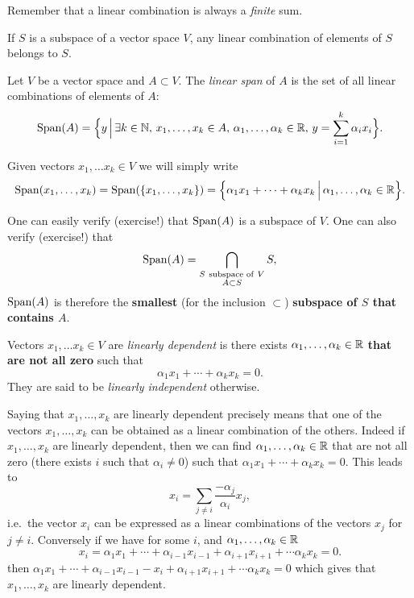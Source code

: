 \documentclass[11pt,nocut]{article}
\begin{document}
Remember that a linear combination is always a \emph{finite} sum.

\begin{remark}
	If $S$ is a subspace of a vector space $V$, any linear combination of elements of $S$ belongs to $S$.
\end{remark}

\begin{definition}[Span]
	Let $V$ be a vector space and $A \subset V$. The \emph{linear span} of $A$ is the set of all linear combinations of elements of $A$:
	$$
	{{\rm Span}}(A) = 
	\Big\{ y \, \Big| \, \exists k \in \mathbb{N}, \, x_1, \dots, x_k \in A, \, \alpha_1, \dots, \alpha_k \in \mathbb{R}, \, y = \sum_{i=1}^k \alpha_i x_i \Big\}.
	$$
\end{definition}
	Given vectors $x_1, \dots x_k \in V$ we will simply write
	$$
	{{\rm Span}}(x_1, \dots, x_k) = {{\rm Span}}(\{x_1, \dots, x_k \}) =
	\Big\{ \alpha_1 x_1 + \cdots + \alpha_k x_k \, \Big| \, \alpha_1, \dots, \alpha_k \in \mathbb{R} \Big\}.
	$$

	One can easily verify (exercise!) that ${{\rm Span}}(A)$ is a subspace of $V$. One can also verify (exercise!) that
$$
{{\rm Span}}(A) = \bigcap_{\substack{S \ \text{subspace of} \ V \\ A \subset S}} S,
$$
${{\rm Span}}(A)$ is therefore the \textbf{smallest} (for the inclusion $\subset$) \textbf{subspace of $S$ that contains $A$}.

\begin{definition}
	Vectors $x_1, \dots x_k \in V$ are \emph{linearly dependent} is there exists $\alpha_1, \dots, \alpha_k \in \mathbb{R}$ \textbf{that are not all zero} such that 
	$$
	\alpha_1 x_1 + \cdots + \alpha_k x_k = 0.
	$$
	They are said to be \emph{linearly independent} otherwise.
\end{definition}

Saying that $x_1, \dots, x_k$ are linearly dependent precisely means that one of the vectors $x_1, \dots, x_k$ can be obtained as a linear combination of the others. 
Indeed if $x_1, \dots, x_k$ are linearly dependent, then we can find $\alpha_1, \dots, \alpha_k \in \mathbb{R}$ that are not all zero (there exists $i$ such that $\alpha_i \neq 0$) such that $\alpha_1 x_1 + \cdots + \alpha_k x_k = 0$. This leads to
$$
x_i = \sum_{j \neq i} \frac{- \alpha_j}{\alpha_i} x_j,
$$
i.e.\ the vector $x_i$ can be expressed as a linear combinations of the vectors $x_j$ for $j \neq i$.
Conversely if we have for some $i$, and $\alpha_1, \dots, \alpha_k \in \mathbb{R}$
$$
x_i = \alpha_1 x_1 + \cdots + \alpha_{i-1} x_{i-1} + \alpha_{i+1} x_{i+1} + \cdots \alpha_k x_k = 0.
$$
then $\alpha_1 x_1 + \cdots + \alpha_{i-1} x_{i-1} - x_i + \alpha_{i+1} x_{i+1} + \cdots \alpha_k x_k = 0$ which gives that $x_1, \dots, x_k$ are linearly dependent. 
\\
\end{document}
